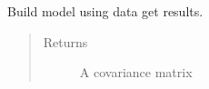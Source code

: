 \documentclass[letterpaper,10pt,english]{sphinxmanual}
\begin{document}
\begin{fulllineitems}
\begin{fulllineitems}
\label{\detokenize{dalio.pipe:dalio.pipe.builders.CovShrink.transform}}
Build model using data get results.
\begin{quote}\begin{description}
\item[{Returns}] \leavevmode
A covariance matrix

\end{description}\end{quote}

\end{fulllineitems}


\end{fulllineitems}

\end{document}
